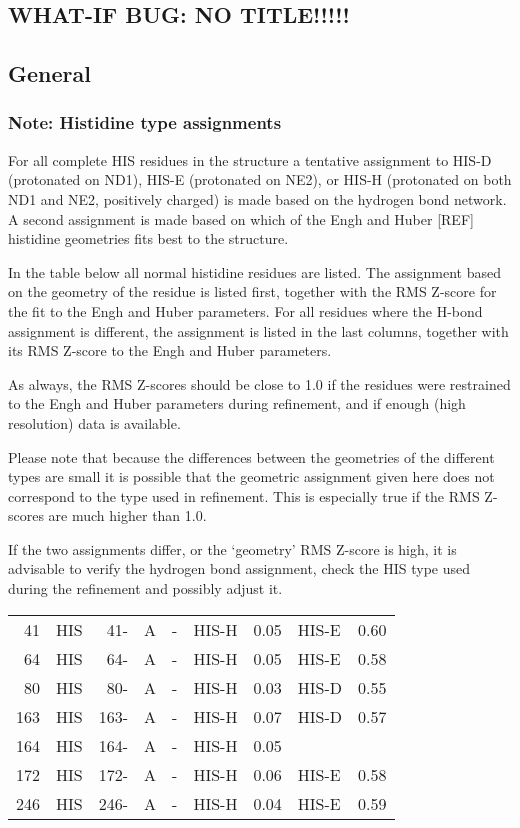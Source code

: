 \documentclass[a4paper]{article}
\def\showsect#1{
  \thesect\gdef\thesect{}
  \thessect\gdef\thessect{}
  \subsubsection{#1}
}
\gdef\thesect{\pagebreak[2]\section{WHAT-IF BUG: NO TITLE!!!!!}}
\gdef\thessect{\subsection{General}}
\begin{document}
\begin{note}
\showsect{Note: Histidine type assignments}
For all complete HIS residues in the structure a tentative assignment to
HIS-D (protonated on ND1), HIS-E (protonated on NE2), or HIS-H (protonated
on both ND1 and NE2, positively charged) is made based on the hydrogen bond
network. A second assignment is made based on which of the Engh and Huber
[REF] histidine geometries fits best to the structure.
 
In the table below all normal histidine residues are listed. The assignment
based on the geometry of the residue is listed first, together with the RMS
Z-score for the fit to the Engh and Huber parameters. For all residues where
the H-bond assignment is different, the assignment is listed in the last
columns, together with its RMS Z-score to the Engh and Huber parameters.
 
As always, the RMS Z-scores should be close to 1.0 if the residues were
restrained to the Engh and Huber parameters during refinement, and if
enough (high resolution) data is available.
 
Please note that because the differences between the geometries of the
different types are small it is possible that the geometric assignment given
here does not correspond to the type used in refinement. This is especially
true if the RMS Z-scores are much higher than 1.0.
 
If the two assignments differ, or the `geometry' RMS Z-score is high, it is
advisable to verify the hydrogen bond assignment, check the HIS type used
during the refinement and possibly adjust it.
 
\begin{center}
 
\begin{supertabular}{rr@{ (}r@{) }rl@{ }lrlr}
   41&HIS &  41-&A &-  &HIS-H&  0.05&HIS-E&  0.60\\
   64&HIS &  64-&A &-  &HIS-H&  0.05&HIS-E&  0.58\\
   80&HIS &  80-&A &-  &HIS-H&  0.03&HIS-D&  0.55\\
  163&HIS & 163-&A &-  &HIS-H&  0.07&HIS-D&  0.57\\
  164&HIS & 164-&A &-  &HIS-H&  0.05\\
  172&HIS & 172-&A &-  &HIS-H&  0.06&HIS-E&  0.58\\
  246&HIS & 246-&A &-  &HIS-H&  0.04&HIS-E&  0.59\\
\end{supertabular}\end{center}
\end{note}
\end{document}
